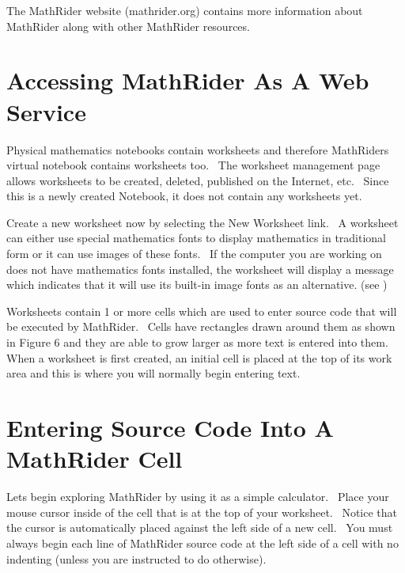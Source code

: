 \documentclass[12pt,twoside]{book}
\begin{document}
\bigskip

The MathRider website (mathrider.org) contains more information about
MathRider along with other MathRider resources.

\section[Accessing MathRider As A Web Service]{Accessing MathRider As A Web Service}

\bigskip


\bigskip


\bigskip


\bigskip


\bigskip


\bigskip

Physical mathematics notebooks contain worksheets and therefore
MathRider{\textquotesingle}s virtual notebook contains worksheets too.
\ The worksheet management page allows worksheets to be created,
deleted, published on the Internet, etc. \ Since this is a newly
created Notebook, it does not contain any worksheets yet. \ 


\bigskip

Create a new worksheet now by selecting the New Worksheet link. \ A
worksheet can either use special mathematics fonts to display
mathematics in traditional form or it can use images of these fonts.
\ If the computer you are working on does not have mathematics fonts
installed, the worksheet will display a message which indicates that it
will use its built{}-in image fonts as an alternative. (see ) 


\bigskip


\bigskip


\bigskip


\bigskip


\bigskip


\bigskip

Worksheets contain 1 or more cells which are used to enter source code
that will be executed by MathRider. \ Cells have rectangles drawn
around them as shown in Figure 6 and they are able to grow larger as
more text is entered into them. When a worksheet is first created, an
initial cell is placed at the top of its work area and this is where
you will normally begin entering text.

\section[Entering Source Code Into A MathRider Cell]{Entering Source Code Into A MathRider Cell}
Lets begin exploring MathRider by using it as a simple calculator.
\ Place your mouse cursor inside of the cell that is at the top of your
worksheet. \ Notice that the cursor is automatically placed against the
left side of a new cell. \ You must always begin each line of MathRider
source code at the left side of a cell with no indenting (unless you
are instructed to do otherwise).
\end{document}
